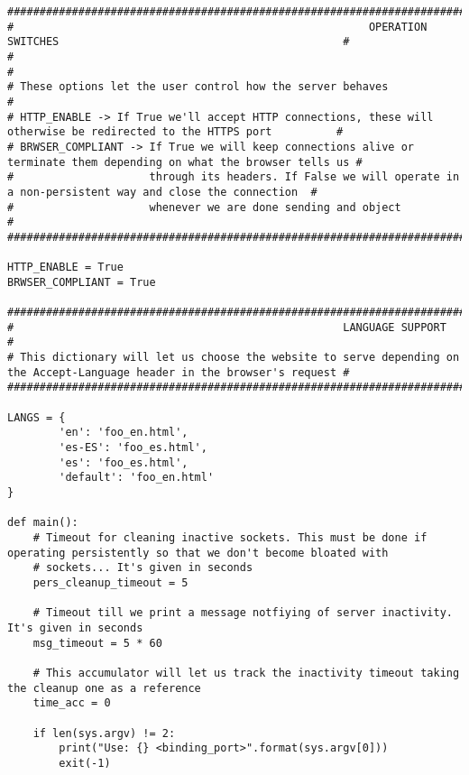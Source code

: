 \documentclass[landscape]{article}
\begin{document}
\begin{verbatim}
#######################################################################################################################
#                                                       OPERATION SWITCHES                                            #
#                                                                                                                     #
# These options let the user control how the server behaves                                                           #
# HTTP_ENABLE -> If True we'll accept HTTP connections, these will otherwise be redirected to the HTTPS port          #
# BRWSER_COMPLIANT -> If True we will keep connections alive or terminate them depending on what the browser tells us #
#                     through its headers. If False we will operate in a non-persistent way and close the connection  #
#                     whenever we are done sending and object                                                         #
#######################################################################################################################

HTTP_ENABLE = True
BRWSER_COMPLIANT = True

############################################################################################################################
#                                                   LANGUAGE SUPPORT                                                       #
# This dictionary will let us choose the website to serve depending on the Accept-Language header in the browser's request #
############################################################################################################################

LANGS = {
        'en': 'foo_en.html',
        'es-ES': 'foo_es.html',
        'es': 'foo_es.html',
        'default': 'foo_en.html'
}

def main():
    # Timeout for cleaning inactive sockets. This must be done if operating persistently so that we don't become bloated with
    # sockets... It's given in seconds
    pers_cleanup_timeout = 5

    # Timeout till we print a message notfiying of server inactivity. It's given in seconds
    msg_timeout = 5 * 60

    # This accumulator will let us track the inactivity timeout taking the cleanup one as a reference
    time_acc = 0

    if len(sys.argv) != 2:
        print("Use: {} <binding_port>".format(sys.argv[0]))
        exit(-1)


\end{verbatim}
\end{document}
